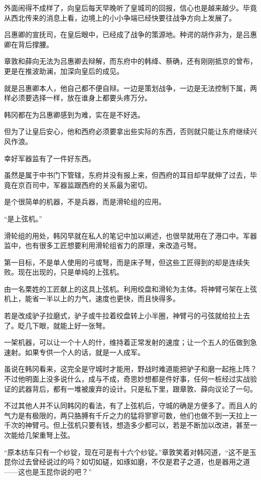 外面闹得不成样了，向皇后每天早晚听了皇城司的回报，信心也是越来越少。毕竟从西北传来的消息上看，边境上的小小争端已经快要往战争方向上发展了。

吕惠卿的宣抚司，在皇后眼中，已经成了战争的策源地。种谔的胡作非为，是吕惠卿在背后撑腰。

章敦和薛向无法为吕惠卿去辩解，而东府中的韩绛、蔡确，还有刚刚抵京的曾布，更是在推波助澜，加深向皇后的成见。

就是吕惠卿本人，他自己都不便自辩。一边是策划战争，一边是无法控制下属，两样必须要选择一样，放在谁身上都要头疼万分。

韩冈都在为吕惠卿感到为难，实在是不好选。

但为了让皇后安心，他和西府必须要拿出些实际的东西，否则就只能让东府继续兴风作浪。

幸好军器监有了一件好东西。

虽然是属于中书门下管辖，东府并没有报上来，但西府的耳目却早就伸了过去，毕竟在京百司中，军器监跟西府的关系最为密切。

是个很简单的机器，不是兵器，而是滑轮组的应用。

“是上弦机。”

滑轮组的用处，韩冈早就在私人的笔记中加以阐述，也很早就用在了港口中。军器监中，也有很多工匠想要利用滑轮组省力的原理，来改造弓弩。

第一目标，不是单人使用的弓或弩，而是床子弩，但这些工匠得到的却是连续失败。现在出现的，只是单纯的上弦机。

由一名栗姓的工匠献上的这具上弦机。利用绞盘和滑轮为主体。将神臂弓架在上弦机上，能省一半以上的力气，速度也更快，而且快得多。

若是改成驴子拉磨式，驴子或牛拉着绞盘转上小半圈，神臂弓的弓弦就给拉上去了。眨几下眼，就能上好一张弩。

一架机器，可以让一个十人的什，维持着正常发射的速度；让一个五人的伍做到急速射。如果专供一个人的话，就是一人成军。

虽说在韩冈看来，这完全是守城时才能用，野战时难道能把驴子和磨一起拖上阵？不过他明面上没多说什么，成与不成，奇思妙想都是件好事，任何一桩经过实战验证的武器背后，都有一堆被废弃的设计。只是私下里，跟章敦、薛向议论了一句。

不过其他人并不认同韩冈的看法，有了上弦机后，守城的确是方便多了。而且人的气力是有极限的，两只胳膊有千斤之力的猛将寥寥可数，他们也做不到一天拉上一千次的神臂弓。但上弦机只要有钱，想造多少都可以，若是不断加以改进，甚至一次能给几架重弩上弦。

“原本纺车只有一个纱锭，现在可是有十六个纱锭。”章敦笑着对韩冈道，“这不是玉昆你过去曾经说过的吗？如切如磋，如琢如磨，不仅是君子之道，也是器用之道——这也是玉昆你说的吧？”

